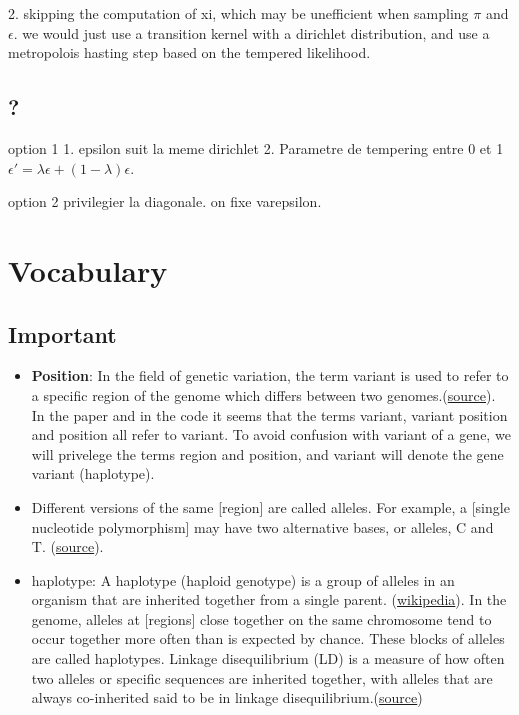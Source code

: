 \documentclass{article}
\begin{document}
2. skipping the computation of xi, which may be unefficient when sampling $\pi$ and $\epsilon$. we would just use a transition kernel with a dirichlet distribution, and use a metropolois hasting step based on the tempered likelihood. 
\subsection {?} 

option 1 
1. epsilon suit la meme dirichlet 
2. Parametre de tempering entre 0 et 1
$\epsilon' =\lambda \epsilon + (1-\lambda) \epsilon$.

option 2 privilegier la diagonale.
on fixe varepsilon.




%
\nocite{*}



\appendix

\section{Vocabulary}

\subsection{Important}

\begin{itemize}
   
    \item {\bf Position}: In the field of genetic variation, the term variant is used to refer to a specific region of the genome which differs between two genomes.(\href{https://www.ebi.ac.uk/training/online/courses/human-genetic-variation-introduction/what-is-genetic-variation/what-are-variants-alleles-and-haplotypes}{source}). In the paper and in the code it seems that the terms  variant, variant position and position all refer to variant.
    To avoid confusion with variant of a gene, we will privelege the terms region and position, and variant will denote the gene variant (haplotype). 
    \item Different versions of the same [region] are called alleles. For example, a [single nucleotide polymorphism] may have two alternative bases, or alleles, C and T. (\href{https://www.ebi.ac.uk/training/online/courses/human-genetic-variation-introduction/what-is-genetic-variation/what-are-variants-alleles-and-haplotypes}{source}).
     \item haplotype: A haplotype (haploid genotype) is a group of alleles in an organism that are inherited together from a single parent. (\href{source}{wikipedia}).
    In the genome, alleles at [regions] close together on the same chromosome tend to occur together more often than is expected by chance. These blocks of alleles are called haplotypes. Linkage disequilibrium (LD) is a measure of how often two alleles or specific sequences are inherited together, with alleles that are always co-inherited said to be in linkage disequilibrium.(\href{https://www.ebi.ac.uk/training/online/courses/human-genetic-variation-introduction/what-is-genetic-variation/what-are-variants-alleles-and-haplotypes}{source})
\end{itemize}
\end{document}
